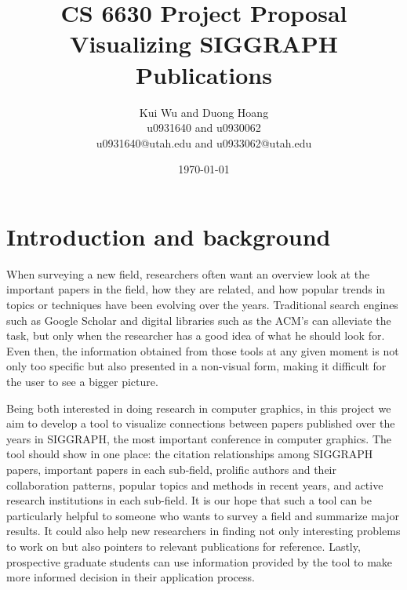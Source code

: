 \documentclass[12pt]{article}
\begin{document}

\title{CS 6630 Project Proposal\\Visualizing SIGGRAPH Publications}
\author{Kui Wu and Duong Hoang\\u0931640 and u0930062\\u0931640@utah.edu and u0933062@utah.edu}
\date{\today}



\maketitle

\section{Introduction and background}
When surveying a new field, researchers often want an overview look at the important papers in the field, how they are related, and how popular trends in topics or techniques have been evolving over the years. Traditional search engines such as Google Scholar and digital libraries such as the ACM's can alleviate the task, but only when the researcher has a good idea of what he should look for. Even then, the information obtained from those tools at any given moment is not only too specific but also presented in a non-visual form, making it difficult for the user to see a bigger picture.

Being both interested in doing research in computer graphics, in this project we aim to develop a tool to visualize connections between papers published over the years in SIGGRAPH, the most important conference in computer graphics. The tool should show in one place: the citation relationships among SIGGRAPH papers, important papers in each sub-field, prolific authors and their collaboration patterns, popular topics and methods in recent years, and active research institutions in each sub-field. It is our hope that such a tool can be particularly helpful to someone who wants to survey a field and summarize major results. It could also help new researchers in finding not only interesting problems to work on but also pointers to relevant publications for reference. Lastly, prospective graduate students can use information provided by the tool to make more informed decision in their application process.
\end{document}
